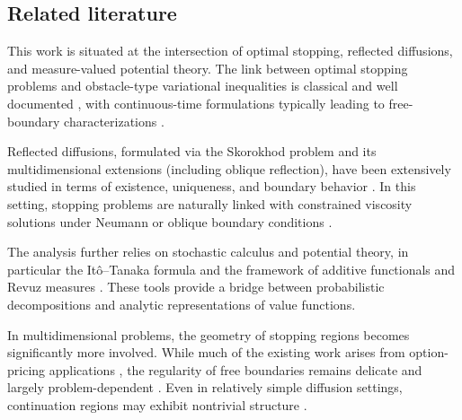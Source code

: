 \documentclass[pdflatex,sn-mathphys-num]{sn-jnl}
\theoremstyle{plain}
\theoremstyle{definition}
\theoremstyle{remark}
\numberwithin{equation}{section}
\begin{document}
\subsection{Related literature} \label{subsec:intro-literature} 

This work is situated at the intersection of optimal stopping, reflected diffusions, and measure-valued potential theory. The link between optimal stopping problems and obstacle-type variational inequalities is classical and well documented \cite{el2006aspects,liu2026ftu,shiryaev2008optimal,peskir2006optimal,wang2025analysis,bensoussan2011applications,friedman1982variational,kinderlehrer2000introduction,wang2025analysis1,talbi2023dynamic,talbi2023viscosity,liu2026computational,colaneri2022class,ekstrom2026dynkin,liang2025global}, with continuous-time formulations typically leading to free-boundary characterizations .

Reflected diffusions, formulated via the Skorokhod problem and its multidimensional extensions (including oblique reflection), have been extensively studied in terms of existence, uniqueness, and boundary behavior
\cite{skorokhod1961stochastic,tanaka1979stochastic,wang2026algebraic,lions1984stochastic,stroock1971diffusion,dupuis1993sdes,kang2017submartingale,wang2026damage,lipshutz2018directional,pilipenko2024boundary,yu2026chemotactic,dianetti2023multidimensional,harrison1981reflected,wang2026breakdown,varadhan1985brownian,reiman1988boundary,taylor1993existence,williams1995semimartingale,yu2026rigorous}.
In this setting, stopping problems are naturally linked with constrained viscosity solutions under Neumann or oblique boundary conditions \cite{crandall1992user,lions1985neumann,yu2026beyond,barles1994solutions,ishii1991fully,soner1986optimal,yu2026microscopic}.

The analysis further relies on stochastic calculus and potential theory, in particular the It\^o--Tanaka formula and the framework of additive functionals and Revuz measures \cite{revuz2013continuous,karatzas2014brownian,cai2026optimal,protter2012stochastic,peskir2005change,revuz1970mesures,wang2026elliptic,blumenthal2007markov,dynkin1965markov,liu2025bidirectional,fukushima2011dirichlet,marcus2006markov}. These tools provide a bridge between probabilistic decompositions and analytic representations of value functions.

In multidimensional problems, the geometry of stopping regions becomes significantly more involved. While much of the existing work arises from option-pricing applications \cite{yu2026fullcovariance,broadie1997valuation,yu2026age,villeneuve1999exercise,liang2026separation}, the regularity of free boundaries remains delicate and largely problem-dependent \cite{dayanik2003optimal,de2020global,yu2026size,laurence2009regularity,wang2025multi,ke2022parallel,gao2022rolling,soner2025stopping,yu2026pattern}. Even in relatively simple diffusion settings, continuation regions may exhibit nontrivial structure .
\end{document}
